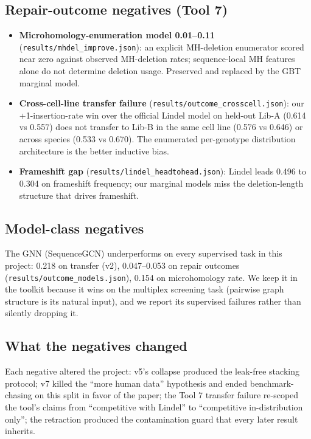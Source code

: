 \subsection{Repair-outcome negatives (Tool 7)}
\begin{itemize}
\item \textbf{Microhomology-enumeration model 0.01--0.11}
(\texttt{results/mhdel\_improve.json}): an explicit MH-deletion enumerator
scored near zero against observed MH-deletion rates; sequence-local MH
features alone do not determine deletion usage. Preserved and replaced by
the GBT marginal model.
\item \textbf{Cross-cell-line transfer failure}
(\texttt{results/outcome\_crosscell.json}): our +1-insertion-rate win over
the official Lindel model on held-out Lib-A (0.614 vs 0.557) does not
transfer to Lib-B in the same cell line (0.576 vs 0.646) or across species
(0.533 vs 0.670). The enumerated per-genotype distribution architecture is
the better inductive bias.
\item \textbf{Frameshift gap} (\texttt{results/lindel\_headtohead.json}):
Lindel leads 0.496 to 0.304 on frameshift frequency; our marginal models
miss the deletion-length structure that drives frameshift.
\end{itemize}

\subsection{Model-class negatives}
The GNN (SequenceGCN) underperforms on every supervised task in this
project: 0.218 on transfer (v2), 0.047--0.053 on repair outcomes
(\texttt{results/outcome\_models.json}), 0.154 on microhomology rate. We
keep it in the toolkit because it wins on the multiplex screening task
(pairwise graph structure is its natural input), and we report its
supervised failures rather than silently dropping it.

\subsection{What the negatives changed}
Each negative altered the project: v5's collapse produced the leak-free
stacking protocol; v7 killed the ``more human data'' hypothesis and ended
benchmark-chasing on this split in favor of the paper; the Tool 7 transfer
failure re-scoped the tool's claims from ``competitive with Lindel'' to
``competitive in-distribution only''; the retraction produced the
contamination guard that every later result inherits.
